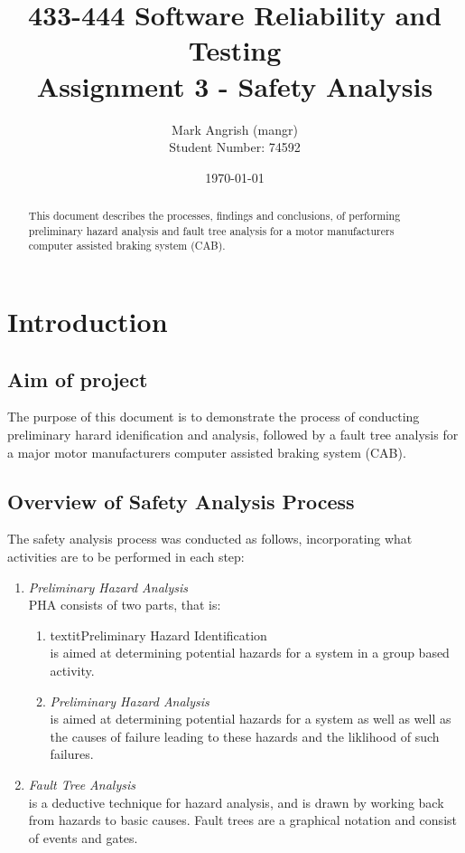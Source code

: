 \documentclass{article}
\title{433-444 Software Reliability and Testing\\
	Assignment 3 - Safety Analysis\\
	}
\author{Mark Angrish (mangr)\\
  Student Number: 74592}
\date{\today}
\begin{document}

\maketitle

\begin{abstract}
\noindent
This document describes the processes, findings and conclusions, of performing
preliminary hazard analysis and fault tree analysis for a motor manufacturers
computer assisted braking system (CAB).
\end{abstract}

\newpage

\tableofcontents

\newpage

\section{Introduction}

\subsection{Aim of project}
The purpose of this document is to demonstrate the process of conducting
preliminary harard idenification and analysis, followed by a fault tree analysis
for a major motor manufacturers computer assisted braking system (CAB).

\subsection{Overview of Safety Analysis Process}
The safety analysis process was conducted as follows, incorporating what
activities are to be performed in each step:

\begin{enumerate}
	\item \textit{Preliminary Hazard Analysis}\\
	\noindent
	PHA consists of two parts, that is:
	\begin{enumerate}
		\item textit{Preliminary Hazard Identification}\\
		\noindent
		is aimed at determining potential hazards for a system in a group 
		based activity.\\
		\item \textit{Preliminary Hazard Analysis}\\
		\noindent
		is aimed at determining potential hazards for a system as well as
		well as the causes of failure leading to these hazards and the 
		liklihood of such failures.\\
	\end{enumerate}	
	\item \textit{Fault Tree Analysis}\\
	\noindent
	is a deductive technique for hazard analysis, and is drawn by working
	back from hazards to basic causes.  Fault trees are a graphical notation
	and consist of events and gates.\\

\end{enumerate}
\end{document}
